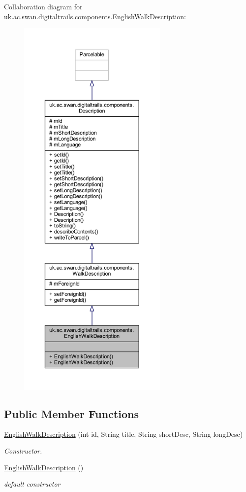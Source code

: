 Collaboration diagram for uk.\+ac.\+swan.\+digitaltrails.\+components.\+English\+Walk\+Description\+:
\nopagebreak
\begin{figure}[H]
\begin{center}
\leavevmode
\includegraphics[height=550pt]{classuk_1_1ac_1_1swan_1_1digitaltrails_1_1components_1_1_english_walk_description__coll__graph}
\end{center}
\end{figure}
\subsection*{Public Member Functions}
\begin{DoxyCompactItemize}
\item 
\hyperlink{classuk_1_1ac_1_1swan_1_1digitaltrails_1_1components_1_1_english_walk_description_a082c62b8255cb8a3233bee0ecf6a86db}{English\+Walk\+Description} (int id, String title, String short\+Desc, String long\+Desc)
\begin{DoxyCompactList}\small\item\em Constructor. \end{DoxyCompactList}\item 
\hyperlink{classuk_1_1ac_1_1swan_1_1digitaltrails_1_1components_1_1_english_walk_description_a1ddd86a84daf7bf1294d8cdd0eafa138}{English\+Walk\+Description} ()
\begin{DoxyCompactList}\small\item\em default constructor \end{DoxyCompactList}\end{DoxyCompactItemize}
